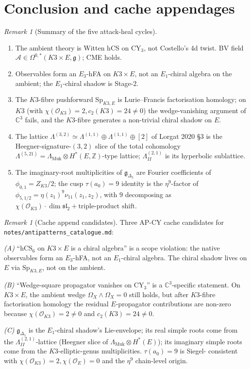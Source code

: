 \documentclass[11pt]{amsart}
\providecommand{\C}{\mathbb{C}}
\providecommand{\Z}{\mathbb{Z}}
\providecommand{\cO}{\mathcal{O}}
\providecommand{\cA}{\mathcal{A}}
\providecommand{\g}{\mathfrak{g}}
\providecommand{\fsl}{\mathfrak{sl}}
\providecommand{\Muk}{\Lambda_{\mathrm{Muk}}}
\providecommand{\HB}{\Lambda^{(2,1)}_{I\!I}}
\providecommand{\LamF}{\Lambda^{(3,2)}}
\providecommand{\Gdelta}{\mathfrak{g}_{\Delta_{5}}}
\providecommand{\SpF}{\mathrm{Sp}}
\theoremstyle{plain}
\theoremstyle{definition}
\theoremstyle{remark}
\newtheorem{remark}[theorem]{Remark}
\begin{document}
\section{Conclusion and cache appendages}

\begin{remark}[Summary of the five attack-heal cycles]\label{rem:summary}
\begin{enumerate}
\item[C1.] The ambient theory is Witten hCS on CY$_{3}$, not Costello's 4d
twist. BV field $\cA\in \Omega^{0,\ast}(K3\times E,\g)$; CME holds.
\item[C2.] Observables form an $E_{3}$-hFA on $K3\times E$, not an
$E_{1}$-chiral algebra on the ambient; the $E_{1}$-chiral shadow is
Stage-$2$.
\item[C3.] The $K3$-fibre pushforward $\SpF_{K3, E}$ is Lurie--Francis
factorisation homology; on $K3$ (with $\chi(\cO_{K3})=2, c_{2}(K3)=24
\neq 0$) the wedge-vanishing argument of $\C^{3}$ fails, and the
$K3$-fibre generates a non-trivial chiral shadow on $E$.
\item[C4.] The lattice $\LamF\simeq \Lambda^{(1,1)}\oplus \Lambda^{(1,1)}
\oplus [2]$ of Lorgat 2020 \S3 is the Heegner-signature-$(3,2)$ slice
of the total cohomology $\Lambda^{(5,21)} = \Muk\otimes
H^{\ast}(E,\Z)$-type lattice; $\HB$ is its hyperbolic sublattice.
\item[C5.] The imaginary-root multiplicities of $\Gdelta$ are Fourier
coefficients of $\phi_{0,1}=Z_{K3}/2$; the cusp $\tau(a_{0}) = 9$
identity is the $\eta^{9}$-factor of $\phi_{5, 1/2}=\eta(z_{1})^{9}
\nu_{11}(z_{1},z_{2})$, with $9$ decomposing as $\chi(\cO_{K3})\cdot
\dim\fsl_{2}+\text{triple-product shift}$.
\end{enumerate}
\end{remark}

\begin{remark}[Cache append candidates]
\label{rem:cache-appendage}
Three AP-CY cache candidates for
\texttt{notes/antipatterns\_catalogue.md}:

\emph{(A)} ``hCS$_{6}$ on $K3\times E$ is a chiral algebra'' is a
scope violation: the native observables form an $E_{3}$-hFA, not an
$E_{1}$-chiral algebra. The chiral shadow lives on $E$ via $\SpF_{K3,E}$,
not on the ambient.

\emph{(B)} ``Wedge-square propagator vanishes on CY$_{3}$'' is a
$\C^{3}$-specific statement. On $K3\times E$, the ambient wedge
$\Omega_{X}\wedge\Omega_{X}=0$ still holds, but after $K3$-fibre
factorisation homology the residual $E$-propagator contributions are
non-zero because $\chi(\cO_{K3}) = 2\neq 0$ and $c_{2}(K3) = 24\neq 0$.

\emph{(C)} $\Gdelta$ is the $E_{1}$-chiral shadow's Lie-envelope; its
real simple roots come from the $\HB$-lattice (Heegner slice of $\Muk
\otimes H^{\ast}(E)$); its imaginary simple roots come from the
$K3$-elliptic-genus multiplicities. $\tau(a_{0}) = 9$ is Siegel-
consistent with $\chi(\cO_{K3}) = 2, \chi(\cO_{E})=0$ and the $\eta^{9}$
chain-level origin.
\end{remark}
\end{document}

